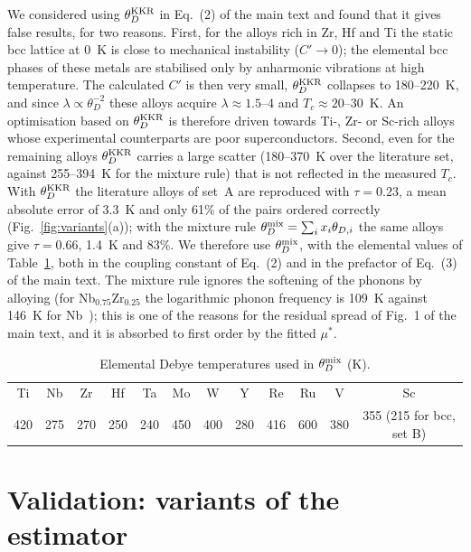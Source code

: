\documentclass[aps,prb,preprint,superscriptaddress,floatfix]{revtex4-2}
\newcommand{\Tc}{$T_c$}
\begin{document}
We considered using $\theta_D^{\rm KKR}$ in Eq.~(2) of the main text and found that it gives
false results, for two reasons. First, for the alloys rich in Zr, Hf and Ti the static bcc
lattice at 0~K is close to mechanical instability ($C' \to 0$); the elemental bcc phases of
these metals are stabilised only by anharmonic vibrations at high temperature. The
calculated $C'$ is then very small, $\theta_D^{\rm KKR}$ collapses to 180--220~K, and since
$\lambda \propto \theta_D^{-2}$ these alloys acquire $\lambda \approx 1.5$--4 and
$T_c \approx 20$--30~K. An optimisation based on $\theta_D^{\rm KKR}$ is therefore driven
towards Ti-, Zr- or Sc-rich alloys whose experimental counterparts are poor
superconductors. Second, even for the remaining alloys $\theta_D^{\rm KKR}$ carries a large
scatter (180--370~K over the literature set, against 255--394~K for the mixture rule) that
is not reflected in the measured \Tc. With $\theta_D^{\rm KKR}$ the literature alloys of
set~A are reproduced with $\tau = 0.23$, a mean absolute error of 3.3~K and only 61\% of the
pairs ordered correctly (Fig.~\ref{fig:variants}(a)); with the mixture rule
$\theta_D^{\rm mix} = \sum_i x_i \theta_{D,i}$ the same alloys give $\tau = 0.66$, 1.4~K and
83\%. We therefore use $\theta_D^{\rm mix}$, with the elemental values of
Table~\ref{tab:thetaD}, both in the coupling constant of Eq.~(2) and in the prefactor of
Eq.~(3) of the main text. The mixture rule ignores the softening of the phonons by alloying
(for Nb$_{0.75}$Zr$_{0.25}$ the logarithmic phonon frequency is 109~K against 146~K for
Nb~\cite{Junod1986}); this is one of the reasons for the residual spread of Fig.~1 of the
main text, and it is absorbed to first order by the fitted $\mu^*$.

\begin{table}
\caption{Elemental Debye temperatures used in $\theta_D^{\rm mix}$ (K).}
\label{tab:thetaD}
\begin{ruledtabular}
\begin{tabular}{cccccccccccc}
Ti & Nb & Zr & Hf & Ta & Mo & W & Y & Re & Ru & V & Sc \\
420 & 275 & 270 & 250 & 240 & 450 & 400 & 280 & 416 & 600 & 380 & 355 (215 for bcc, set B) \\
\end{tabular}
\end{ruledtabular}
\end{table}

\clearpage
\section{Validation: variants of the estimator}
\label{sec:variants}
\end{document}
